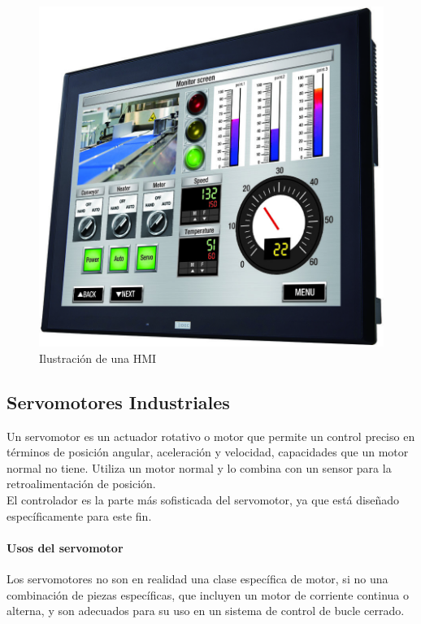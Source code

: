 \documentclass[12pt,titlepage]{article}
\begin{document}
\begin{figure}[htbp]
\hspace*{4.5cm} 
\includegraphics[scale=1.10]{HMI}
\caption{Ilustración de una HMI}
\end{figure}
\newpage

\subsection{Servomotores Industriales}
Un servomotor es un actuador rotativo o motor que permite un control preciso en términos de posición angular, aceleración y velocidad, capacidades que un motor normal no tiene. Utiliza un  motor normal y lo combina con un sensor para la retroalimentación de posición. \\

El controlador es la parte más sofisticada del servomotor, ya que está diseñado específicamente para este fin. \\ 

\paragraph{Usos del servomotor}\leavevmode\newline
Los servomotores no son en realidad una clase específica de motor, si no una combinación de piezas específicas, que incluyen un motor de corriente continua o alterna, y son adecuados para su uso en un sistema de control de bucle cerrado. \\
\end{document}

